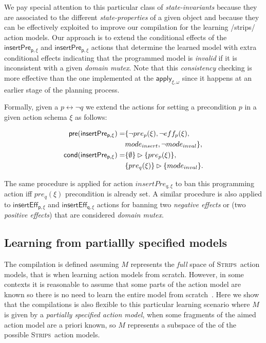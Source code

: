 \documentclass{article}
\newcommand{\pre}{\mathsf{pre}}     %
\newcommand{\cond}{\mathsf{cond}}   %
\newcommand{\strips}{\textsc{Strips}}
\begin{document}
We pay special attention to this particular class of {\em state-invariants} because they are associated to the different {\em state-properties} of a given object and because they can be effectively exploited to improve our compilation for the learning /strips/ action models. Our approach is to extend the conditional effects of the $\mathsf{insertPre_{p,\xi}}$ and $\mathsf{insertPre_{p,\xi}}$ actions that determine the learned model with extra conditional effects indicating that the programmed model is {\em invalid} if it is inconsistent with a given {\em domain mutex}. Note that this {\em consistency} checking is more effective than the one implemented at the $\mathsf{apply_{\xi,\omega}}$ since it happens at an earlier stage of the planning process.

Formally, given a $p\leftrightarrow \neg q$ we extend the actions for setting a precondition $p$ in a given action schema $\xi$ as follows:

\begin{small}
\begin{align*}
\hspace*{7pt}\pre(\mathsf{insertPre_{p,\xi}})=&\{\neg pre_{p}(\xi), \neg eff_{p}(\xi),\\
&mode_{insert},\neg mode_{inval}\},\\
\cond(\mathsf{insertPre_{p,\xi}})=&\{\emptyset\}\rhd\{pre_{p}(\xi)\},\\
&\{pre_{q}(\xi)\}\rhd\{mode_{inval}\}.
\end{align*}
\end{small}
The same procedure is applied for action $insertPre_{q,\xi}$ to ban this programming action iff $pre_{q}(\xi)$ precondition is already set. A similar procedure is also applied to $\mathsf{insertEff_{p,\xi}}$ and $\mathsf{insertEff_{q,\xi}}$ actions for banning two {\em negative effects} or (two {\em positive effects}) that are considered {\em domain mutex}.


\subsection{Learning from partiallly specified models}
The compilation is defined assuming $M$ represents the {\em full} space of \strips\ action models, that is when learning action models from scratch. However, in some contexts it is reasonable to assume that some parts of the action model are known so there is no need to learn the entire model from scratch~\cite{ZhuoNK13}. Here we show that the compilations is also flexible to this particular learning scenario where $M$ is given by a {\em partially specified action model}, when some fragments of the aimed action model are a priori known, so $M$ represents a subspace of the of the possible \strips\ action models\cite{sreedharan2018handling}.
\end{document}
